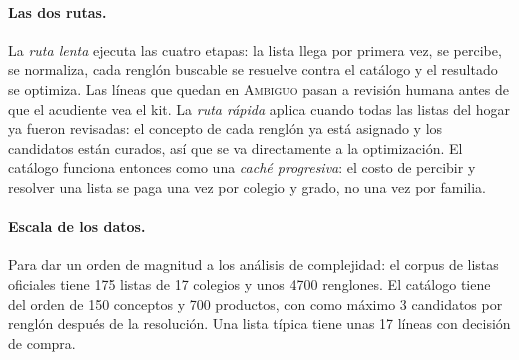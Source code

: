 \paragraph{Las dos rutas.} La \emph{ruta lenta} ejecuta las cuatro etapas: la
lista llega por primera vez, se percibe, se normaliza, cada renglón buscable
se resuelve contra el catálogo y el resultado se optimiza. Las líneas que
quedan en \textsc{Ambiguo} pasan a revisión humana antes de que el acudiente
vea el kit. La \emph{ruta rápida} aplica cuando todas las listas del hogar ya
fueron revisadas: el concepto de cada renglón ya está asignado y los candidatos
están curados, así que se va directamente a la optimización. El catálogo
funciona entonces como una \emph{caché progresiva}: el costo de percibir y
resolver una lista se paga una vez por colegio y grado, no una vez por
familia.

\paragraph{Escala de los datos.} Para dar un orden de magnitud a los análisis
de complejidad: el corpus de listas oficiales tiene 175 listas de 17 colegios
y unos \num{4700} renglones. El catálogo tiene del orden de 150 conceptos y
700 productos, con como máximo 3 candidatos por renglón después de la
resolución. Una lista típica tiene unas 17 líneas con decisión de compra.
